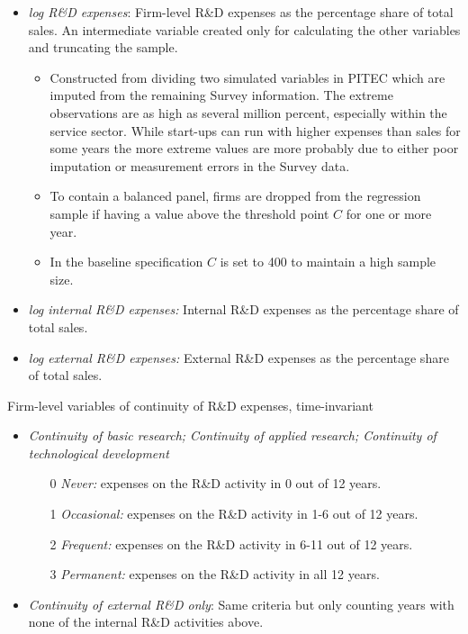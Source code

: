 \begin{itemize}
  \item \textit{log R\&D expenses}: Firm-level R\&D expenses as the percentage share of total sales. An intermediate variable created only for calculating the other variables and truncating the sample.
  \begin{itemize}
    \item Constructed from dividing two simulated variables in PITEC which are imputed from the remaining Survey information. The extreme observations are as high as several million percent, especially within the service sector. While start-ups can run with higher expenses than sales for some years the more extreme values are more probably due to either poor imputation or measurement errors in the Survey data.
    \item To contain a balanced panel, firms are dropped from the regression sample if having a value above the threshold point $C$ for one or more year.
    \item In the baseline specification $C$ is set to 400 to maintain a high sample size.
  \end{itemize}
  \item \textit{log internal R\&D expenses:} Internal R\&D expenses as the percentage share of total sales.
  \item \textit{log external R\&D expenses:} External R\&D expenses as the percentage share of total sales.
\end{itemize}
\noindent
Firm-level variables of continuity of R\&D expenses, time-invariant
\begin{itemize}
  \item \textit{Continuity of basic research; Continuity of applied research; Continuity of technological development}
  \begin{itemize}
    \item[0] \textit{Never:} expenses on the R\&D activity in 0 out of 12 years.
    \item[1] \textit{Occasional:} expenses on the R\&D activity in 1-6 out of 12 years.
    \item[2] \textit{Frequent:} expenses on the R\&D activity in 6-11 out of 12 years.
    \item[3] \textit{Permanent:} expenses on the R\&D activity in all 12 years.
  \end{itemize}
  \item \textit{Continuity of external R\&D only}: Same criteria but only counting years with none of the internal R\&D activities above.
\end{itemize}
